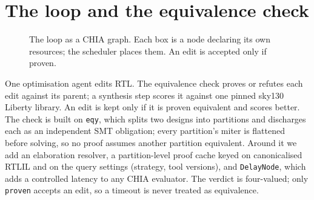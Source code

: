 \documentclass[sigconf,nonacm]{acmart}
\begin{document}
\section{The loop and the equivalence check}
\label{sec:method}

\begin{figure}[t]
\centering
{}
\caption{The loop as a CHIA graph. Each box is a node declaring its own
resources; the scheduler places them. An edit is accepted only if proven.}
\label{fig:loop}
\end{figure}

One optimisation agent edits RTL. The equivalence check proves or refutes each
edit against its parent; a synthesis step scores it against one pinned sky130
Liberty library. An edit is kept only if it is proven equivalent and scores
better. The check is built on \texttt{eqy}, which splits two designs into
partitions and discharges each as an independent SMT obligation; every
partition's miter is flattened before solving, so no proof assumes another
partition equivalent. Around it we add an elaboration resolver, a
partition-level proof cache keyed on canonicalised RTLIL and on the query
settings (strategy, tool versions), and \texttt{DelayNode}, which adds a
controlled latency to any CHIA evaluator. The verdict is four-valued; only
\texttt{proven} accepts an edit, so a timeout is never treated as equivalence.
\end{document}
